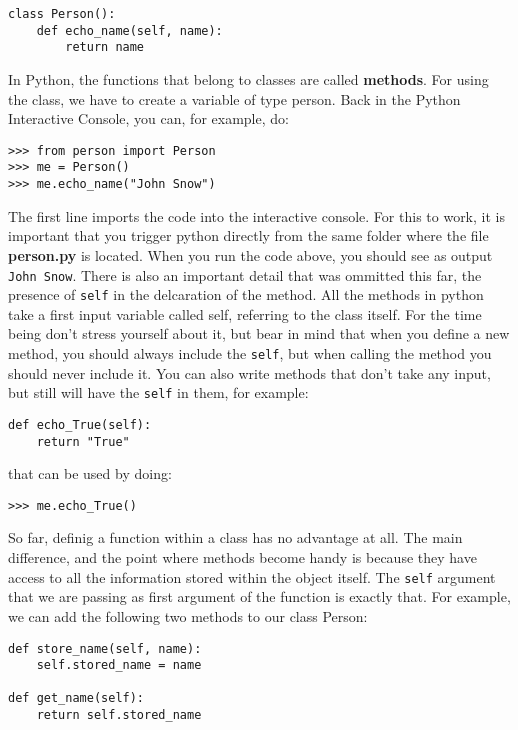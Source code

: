 \begin{verbatim}
class Person():
    def echo_name(self, name):
        return name
\end{verbatim}

In Python, the functions that belong to classes are called \textbf{methods}. For
using the class, we have to create a variable of type person. Back in the Python Interactive Console, you can, for example, do:

\begin{verbatim}
>>> from person import Person
>>> me = Person()
>>> me.echo_name("John Snow")
\end{verbatim}

The first line imports the code into the interactive console. For this to work, it is important that you trigger python directly from the same folder where the file \textbf{person.py} is located. When you run the code above, you should see as output \texttt{John Snow}. There is also an
important detail that was ommitted this far, the presence of
\texttt{self} in the delcaration of the method. All the methods in
python take a first input variable called self, referring to the class
itself. For the time being don't stress yourself about it, but bear in
mind that when you define a new method, you should always include the
\texttt{self}, but when calling the method you should never include it.
You can also write methods that don't take any input, but still will
have the \texttt{self} in them, for example:

\begin{verbatim}
def echo_True(self):
    return "True"
\end{verbatim}

that can be used by doing:

\begin{verbatim}
>>> me.echo_True()
\end{verbatim}

So far, definig a function within a class has no advantage at all. The
main difference, and the point where methods become handy is because
they have access to all the information stored within the object itself.
The \texttt{self} argument that we are passing as first argument of the
function is exactly that. For example, we can add the following two
methods to our class Person:

\begin{verbatim}
def store_name(self, name):
    self.stored_name = name

def get_name(self):
    return self.stored_name
\end{verbatim}


